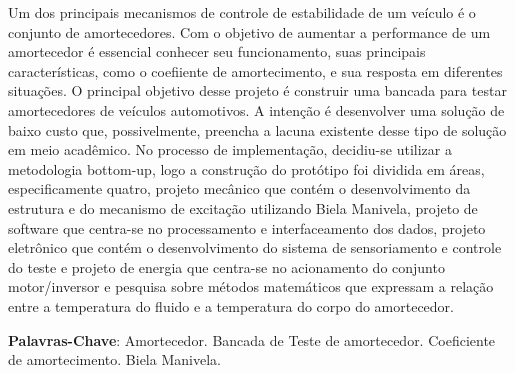 \begin{resumo}[Resumo]
Um dos principais mecanismos de controle de estabilidade de um veículo é o conjunto de amortecedores. Com o objetivo de aumentar a performance de um amortecedor é essencial conhecer seu funcionamento, suas principais características, como o coefiiente de amortecimento, e sua resposta em diferentes situações. O principal objetivo desse projeto é construir uma bancada para testar amortecedores de veículos automotivos. A intenção é desenvolver uma solução de baixo custo que, possivelmente, preencha a lacuna existente desse tipo de solução em meio acadêmico. No processo de implementação, decidiu-se utilizar a metodologia bottom-up, logo a construção do protótipo foi dividida em áreas, especificamente quatro, projeto mecânico que contém o desenvolvimento da estrutura e do mecanismo de excitação utilizando Biela Manivela, projeto de software que centra-se no processamento e interfaceamento dos dados, projeto eletrônico que contém o desenvolvimento do sistema de sensoriamento e controle do teste e projeto de energia que centra-se no acionamento do conjunto motor/inversor e pesquisa sobre métodos matemáticos que expressam a relação entre a temperatura do fluido e a temperatura do corpo do amortecedor. 


   \vspace{\onelineskip}
 
   \noindent 
   
   \textbf{Palavras-Chave}: Amortecedor. Bancada de Teste de amortecedor. Coeficiente de amortecimento. Biela Manivela.

\end{resumo}
